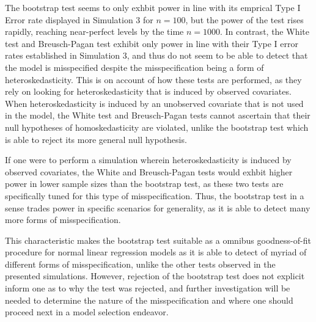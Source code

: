 		The bootstrap test seems to only exhbit power in line with its emprical Type I Error rate displayed in Simulation 3 for $n = 100$, but the power of the test rises
		rapidly, reaching near-perfect levels by the time $n = 1000$. In contrast, the White test and Breusch-Pagan test exhibit only power in line with their Type I error
		rates established in Simulation 3, and thus do not seem to be able to detect that the model is misspecified despite the misspecification being a form of
		heteroskedasticity. This is on account of how these tests are performed, as they rely on looking for heteroskedasticity that is induced by observed covariates.
		When heteroskedasticity is induced by an unobserved covariate that is not used in the model, the White test and Breusch-Pagan tests cannot ascertain that their
		null hypotheses of homoskedasticity are violated, unlike the bootstrap test which is able to reject its more general null hypothesis.

		If one were to perform a simulation wherein heteroskedasticity is induced by observed covariates, the White and Breusch-Pagan tests would exhbit higher power in lower
		sample sizes than the bootstrap test, as these two tests are specifically tuned for this type of misspecification. Thus, the bootstrap test in a sense trades power in specific
		scenarios for generality, as it is able to detect many more forms of misspecification.
		
		This characteristic makes the bootstrap test suitable as a omnibus goodness-of-fit procedure for normal linear regression models as it is able to detect of myriad of different
		forms of misspecification, unlike the other tests observed in the presented simulations. However, rejection of the bootstrap test does not explicit inform one as to why the test
		was rejected, and further investigation will be needed to determine the nature of the misspecification and where one should proceed next in a model selection endeavor.



